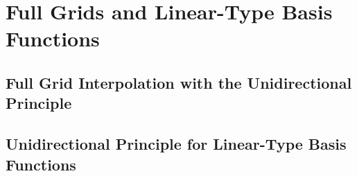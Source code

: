 \section{Full Grids and Linear-Type Basis Functions}


\subsection{Full Grid Interpolation with the Unidirectional Principle}


\subsection{Unidirectional Principle for Linear-Type Basis Functions}

